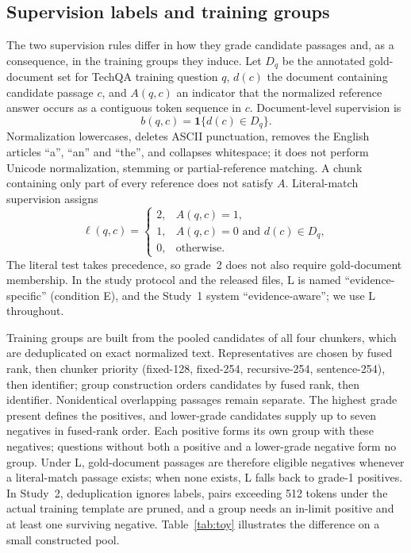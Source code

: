 \subsection{Supervision labels and training groups}
The two supervision rules differ in how they grade candidate passages and, as a consequence, in the training groups they induce. Let $D_q$ be the annotated gold-document set for TechQA training question $q$, $d(c)$ the document containing candidate passage $c$, and $A(q,c)$ an indicator that the normalized reference answer occurs as a contiguous token sequence in $c$. Document-level supervision is
\begin{equation}
 b(q,c)=\mathbf{1}\{d(c)\in D_q\}.
\end{equation}
Normalization lowercases, deletes ASCII punctuation, removes the English articles ``a'', ``an'' and ``the'', and collapses whitespace; it does not perform Unicode normalization, stemming or partial-reference matching. A chunk containing only part of every reference does not satisfy $A$. Literal-match supervision assigns
\begin{equation}
 \ell(q,c)=\begin{cases}2,&A(q,c)=1,\\1,&A(q,c)=0\text{ and }d(c)\in D_q,\\0,&\text{otherwise}.\end{cases}
\end{equation}
The literal test takes precedence, so grade~2 does not also require gold-document membership. In the study protocol and the released files, L is named ``evidence-specific'' (condition E), and the Study~1 system ``evidence-aware''; we use L throughout.

Training groups are built from the pooled candidates of all four chunkers, which are deduplicated on exact normalized text. Representatives are chosen by fused rank, then chunker priority (fixed-128, fixed-254, recursive-254, sentence-254), then identifier; group construction orders candidates by fused rank, then identifier. Nonidentical overlapping passages remain separate. The highest grade present defines the positives, and lower-grade candidates supply up to seven negatives in fused-rank order. Each positive forms its own group with these negatives; questions without both a positive and a lower-grade negative form no group. Under L, gold-document passages are therefore eligible negatives whenever a literal-match passage exists; when none exists, L falls back to grade-1 positives. In Study~2, deduplication ignores labels, pairs exceeding 512 tokens under the actual training template are pruned, and a group needs an in-limit positive and at least one surviving negative. Table~\ref{tab:toy} illustrates the difference on a small constructed pool.

